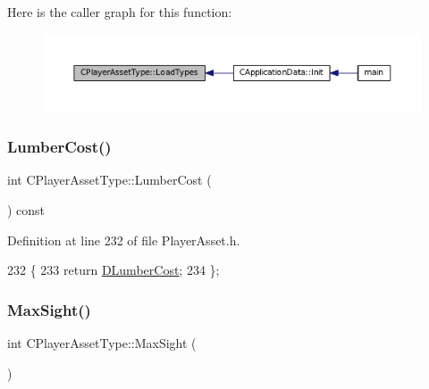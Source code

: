 Here is the caller graph for this function\+:
\nopagebreak
\begin{figure}[H]
\begin{center}
\leavevmode
\includegraphics[width=350pt]{classCPlayerAssetType_ad36348338ae4fea7e70450ef30c92a26_icgraph}
\end{center}
\end{figure}
\hypertarget{classCPlayerAssetType_a0263936149918ed7fe3844bcd0e15d72}{}\label{classCPlayerAssetType_a0263936149918ed7fe3844bcd0e15d72} 
\subsubsection{\texorpdfstring{Lumber\+Cost()}{LumberCost()}}
{\footnotesize\ttfamily int C\+Player\+Asset\+Type\+::\+Lumber\+Cost (\begin{DoxyParamCaption}{ }\end{DoxyParamCaption}) const\hspace{0.3cm}{\ttfamily [inline]}}



Definition at line 232 of file Player\+Asset.\+h.


\begin{DoxyCode}
232                               \{
233             \textcolor{keywordflow}{return} \hyperlink{classCPlayerAssetType_aab2aeb930d654fd5eab51be157b3439f}{DLumberCost};  
234         \};
\end{DoxyCode}
\hypertarget{classCPlayerAssetType_a1c1648ef0fdd2d112508c2ef9b7b70d1}{}\label{classCPlayerAssetType_a1c1648ef0fdd2d112508c2ef9b7b70d1} 
\subsubsection{\texorpdfstring{Max\+Sight()}{MaxSight()}}
{\footnotesize\ttfamily int C\+Player\+Asset\+Type\+::\+Max\+Sight (\begin{DoxyParamCaption}{ }\end{DoxyParamCaption})\hspace{0.3cm}{\ttfamily [static]}}



